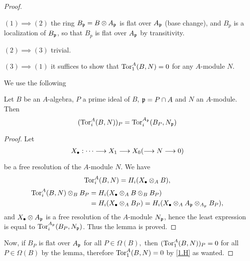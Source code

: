 \documentclass[../main]{subfiles}
\begin{document}
\begin{proof}\phantom{,}
\begin{implyenumerate}
    \item[$(1)\implies(2)$] the ring $B_{\mathfrak{p}} = B \otimes A_{\mathfrak{p}}$ is flat over $A_{\mathfrak{p}}$ (base change), and $B_p$ is a localization of $B_{\mathfrak{p}}$, so that $B_p$ is flat over $A_{\mathfrak{p}}$ by transitivity.
    \item[$(2) \implies (3)$] trivial.
    \item[$(3) \implies (1)$] it suffices to show that $\operatorname{Tor}_1^A(B,N)=0$ for any $A$-module $N$.
\end{implyenumerate}

We use the following

\begin{lemma}
    Let $B$ be an $A$-algebra, $P$ a prime ideal of $B$, $\mathfrak{p} = P \cap A $ and $N$ an $A$-module. Then
    \[
        (\operatorname{Tor}_i^A(B,N))_P = \operatorname{Tor}_i^{A_{\mathfrak{p}}}(B_P, N_{\mathfrak{p}}) 
    \] 
\end{lemma}

\begin{proof} 
Let \[X_\bullet: \cdots \varrightarrow{} X_1 \varrightarrow{} X_0 ( \varrightarrow{} N \varrightarrow{} 0)\] be a free resolution of the $A$-module $N$. We have 
\[\operatorname{Tor}_i^A(B,N)= H_i(X_\bullet \otimes_A B),\]
\[\begin{aligned}
    \operatorname{Tor}_i^A(B,N) \otimes_BB_P&= H_i(X_\bullet \otimes_A B \otimes_B B_P )\\
    &= H_i(X_\bullet \otimes_A B_P) = H_i(X_\bullet \otimes_A A_{\mathfrak{p}}\otimes_{A_{\mathfrak{p} }}B_P),
\end{aligned}\]
and $X_\bullet \otimes A_{\mathfrak{p}}$ is a free resolution of the $A$-module $N_{\mathfrak{p}}$, hence the least expression is equal to $\operatorname{Tor}_i^{A_{\mathfrak{p}}}(B_P, N_{\mathfrak{p}})$. Thus the lemma is proved.
\end{proof}

Now, if $B_P$ is flat over $A_{\mathfrak{p}}$ for all $P \in \Omega(B),$ then $(\operatorname{Tor}_1^A(B,N) )_P = 0$ for all $P \in \Omega(B)$ by the lemma, therefore $\operatorname{Tor}_1^A(B,N)=0 $ by \ref{1.H} as wanted.
\end{proof}
\end{document}
